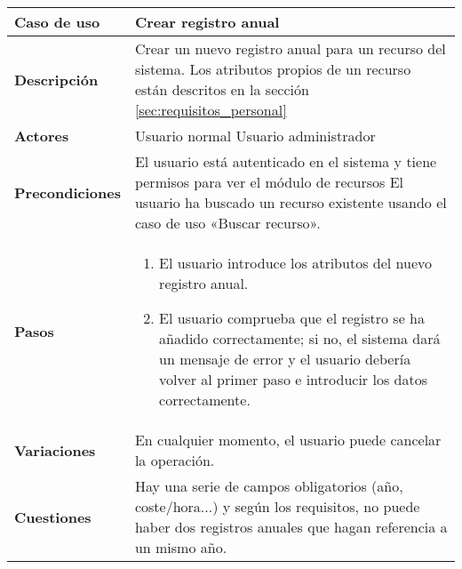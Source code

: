\begin{tabular}{|p{1.25in}|p{3.65in}|}\hline
\textbf{Caso de uso} & \textbf{Crear registro anual}\\\hline\hline
\textbf{Descripción} & Crear un nuevo registro anual para un recurso del
sistema. Los atributos propios de un recurso están descritos en la sección
\ref{sec:requisitos_personal}\\\hline
\textbf{Actores} & Usuario normal \newline Usuario administrador\\\hline
\textbf{Precondiciones} & El usuario está autenticado en el sistema y
tiene permisos para ver el módulo de recursos \newline El usuario ha
buscado un recurso existente usando el caso de uso «Buscar recurso».\\\hline
\textbf{Pasos} &
  \begin{enumerate}
   \item El usuario introduce los atributos del nuevo registro anual.
   \item El usuario comprueba que el registro se ha añadido correctamente; si
no, el sistema dará un mensaje de error y el usuario debería volver al primer
paso e introducir los datos correctamente.
  \end{enumerate}
\\\hline
\textbf{Variaciones} & En cualquier momento, el usuario puede cancelar
la operación.\\\hline
\textbf{Cuestiones} & Hay una serie de campos obligatorios (año,
coste/hora...) y según los requisitos, no puede haber dos registros
anuales que hagan referencia a un mismo año.\\\hline
\end{tabular}

